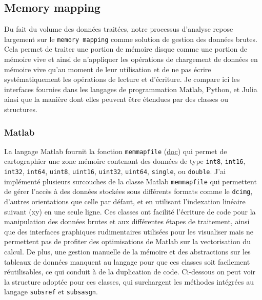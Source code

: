 \subsection{Memory mapping}

Du fait du volume des données traitées, notre processus d'analyse repose largement sur le \verb|memory mapping| comme solution de gestion des données brutes. Cela permet de traiter une portion de mémoire disque comme une portion de mémoire vive et ainsi de n'appliquer les opérations de chargement de données en mémoire vive qu'au moment de leur utilisation et de ne pas écrire systématiquement les opérations de lecture et d'écriture. Je compare ici les interfaces fournies dans les langages de programmation Matlab, Python, et Julia ainsi que la manière dont elles peuvent être étendues par des classes ou structures.

\subsubsection{Matlab}

La langage Matlab fournit la fonction \verb|memmapfile| (\href{https://fr.mathworks.com/help/matlab/ref/memmapfile.html}{doc}) qui permet de cartographier une zone mémoire contenant des données de type \verb|int8|, \verb|int16|, \verb|int32|, \verb|int64|, \verb|uint8|, \verb|uint16|, \verb|uint32|, \verb|uint64|, \verb|single|, ou \verb|double|.
J'ai implémenté plusieurs surcouches de la classe Matlab \verb|memmapfile| qui permettent de gérer l'accès à des données stockées sous différents formats comme le \verb|dcimg|, d'autres orientations que celle par défaut, et en utilisant l'indexation linéaire suivant (xy) en une seule ligne. Ces classes ont facilité l'écriture de code pour la manipulation des données brutes et aux différentes étapes de traitement, ainsi que des interfaces graphiques rudimentaires utilisées pour les visualiser mais ne permettent pas de profiter des optimisations de Matlab sur la vectorisation du calcul.
De plus, une gestion manuelle de la mémoire et des abstractions sur les tableaux de données manquent au langage pour que ces classes soit facilement réutilisables, ce qui conduit à de la duplication de code. Ci-dessous on peut voir la structure adoptée pour ces classes, qui surchargent les méthodes intégrées au langage \verb|subsref| et \verb|subsasgn|.


